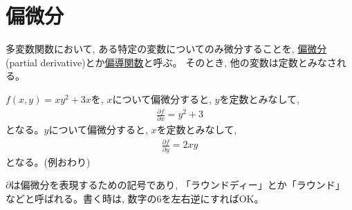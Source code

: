 \section{偏微分}
多変数関数において, ある特定の変数についてのみ微分することを, \underline{偏微分}
(partial derivative)とか\underline{偏導関数}と呼ぶ。
そのとき, 他の変数は定数とみなされる。

\begin{exmpl}$f(x,y)=xy^2+3x$を, $x$について偏微分すると, $y$を定数とみなして, 
\begin{eqnarray*} \frac{\partial f}{\partial x} = y^2+3 \end{eqnarray*}
となる。$y$について偏微分すると, $x$を定数とみなして, 
\begin{eqnarray*} \frac{\partial f}{\partial y} = 2xy \end{eqnarray*}
となる。(例おわり)\end{exmpl}

$\partial$は偏微分を表現するための記号であり, 「ラウンドディー」とか「ラウンド」
などと呼ばれる。書く時は, 数字の$6$を左右逆にすればOK。
\begin{freqmiss}{\small{}}\end{freqmiss}

